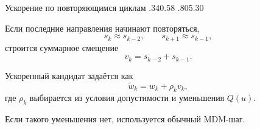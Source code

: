 \SPBGSplitSlide
  {Ускорение по повторяющимся циклам}
  {.340}{.58}
  {%
    \ReportCycleAcceleration
  }
  {.805}{.30}
  {%
    \SplitBody
    Если последние направления начинают повторяться,
    \[
      s_k\approx s_{k-2},\qquad
      s_{k+1}\approx s_{k-1},
    \]
    строится суммарное смещение
    \[
      v_k=s_{k-2}+s_{k-1}.
    \]

    Ускоренный кандидат задаётся как
    \[
      \widetilde w_k=w_k+\rho_k v_k,
    \]
    где \(\rho_k\) выбирается из условия допустимости и уменьшения
    \(Q(u)\).

    Если такого уменьшения нет, используется обычный MDM-шаг.
  }
